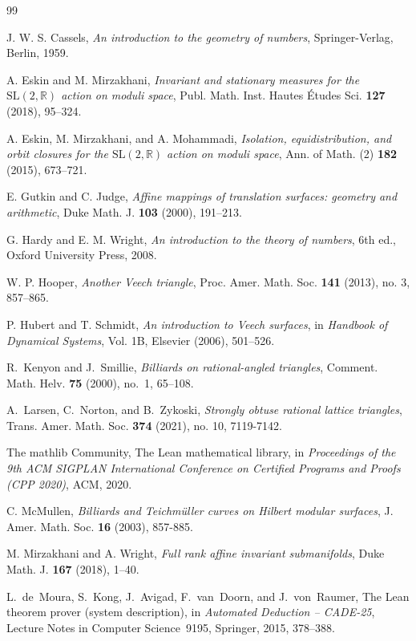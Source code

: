 \documentclass[12pt]{amsart}
\theoremstyle{definition}
\begin{document}
\begin{thebibliography}{99}
\setlength{\itemsep}{0pt plus 0.5pt}\setlength{\parsep}{0pt}

J. W. S. Cassels,
\emph{An introduction to the geometry of numbers},
Springer-Verlag, Berlin, 1959.

A. Eskin and M. Mirzakhani,
\emph{Invariant and stationary measures for the $\mathrm{SL}(2,\mathbb{R})$ action on moduli space},
Publ. Math. Inst. Hautes \'Etudes Sci. \textbf{127} (2018), 95--324.

A. Eskin, M. Mirzakhani, and A. Mohammadi,
\emph{Isolation, equidistribution, and orbit closures for the $\mathrm{SL}(2,\mathbb{R})$ action on moduli space},
Ann. of Math. (2) \textbf{182} (2015), 673--721.

E. Gutkin and C. Judge,
\emph{Affine mappings of translation surfaces: geometry and arithmetic},
Duke Math. J. \textbf{103} (2000), 191--213.

G. Hardy and E. M. Wright,
\emph{An introduction to the theory of numbers},
6th ed., Oxford University Press, 2008.

W. P. Hooper, \emph{Another Veech triangle}, Proc. Amer. Math. Soc. \textbf{141} (2013), no. 3, 857--865.

P. Hubert and T. Schmidt,
\emph{An introduction to Veech surfaces}, in \emph{Handbook of Dynamical Systems}, Vol. 1B, Elsevier (2006), 501--526.

R.~Kenyon and J.~Smillie,
\emph{Billiards on rational-angled triangles},
Comment. Math. Helv. \textbf{75} (2000), no.~1, 65--108.

A.\ Larsen, C.\ Norton, and B.\ Zykoski,
\emph{Strongly obtuse rational lattice triangles}, Trans. Amer. Math. Soc. \textbf{374} (2021), no. 10, 7119-7142.


The mathlib Community,
The {L}ean mathematical library,
in \emph{Proceedings of the 9th ACM SIGPLAN International Conference on
Certified Programs and Proofs (CPP 2020)},
ACM, 2020.

C. McMullen,
\emph{Billiards and Teichm\"uller curves on Hilbert modular surfaces},
J. Amer. Math. Soc. \textbf{16}  (2003), 857-885.


M. Mirzakhani and A. Wright,
\emph{Full rank affine invariant submanifolds},
Duke Math. J. \textbf{167} (2018), 1--40.

L.~de~Moura, S.~Kong, J.~Avigad, F.~van~Doorn, and J.~von~Raumer,
The {L}ean theorem prover (system description),
in \emph{Automated Deduction -- CADE-25},
Lecture Notes in Computer Science~9195, Springer, 2015, 378--388.


\end{thebibliography}
\end{document}
